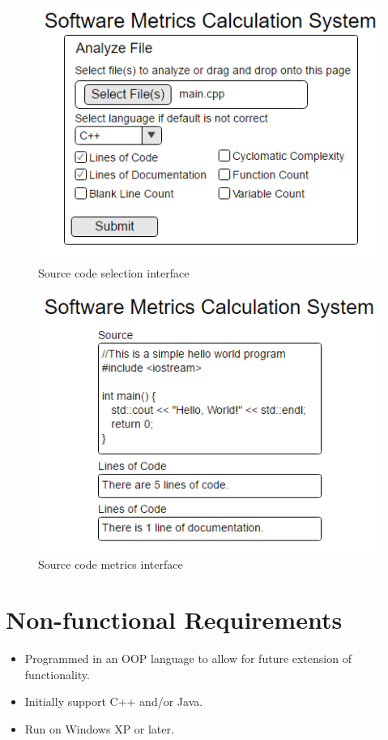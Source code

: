 \documentclass{scrreprt}
\begin{document}
	\begin{figure}[h]
		\centering
		\includegraphics[scale=0.5]{user-interface1.png}
		\caption{Source code selection interface}
	\end{figure}
	
	\begin{figure}[h]
		\centering
		\includegraphics[scale=0.5]{user-interface2.png}
		\caption{Source code metrics interface}
	\end{figure}
	
	\section{Non-functional Requirements}
	\begin{itemize}
		\item Programmed in an OOP language to allow for future extension of functionality.
		\item Initially support C++ and/or Java.
		\item Run on Windows XP or later.
	\end{itemize}
\end{document}
